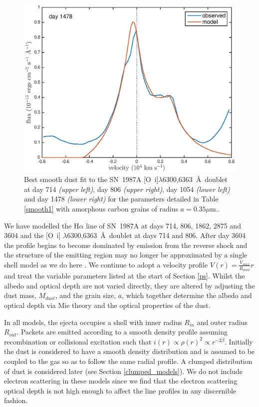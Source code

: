 \documentclass[useAMS,usenatbib,usegraphicx]{mnras}
\begin{document}
\begin{figure}
\begin{center}
\includegraphics[trim =37 10 45 15,clip=true,scale=0.41]{smooth/best_fit/d1478OI}
\caption{Best smooth dust fit to the SN~1987A [O~{\sc i}]$\lambda$6300,6363~\AA\ doublet at day 714 \textit{(upper left)}, day 806 \textit{(upper right)}, day 1054 \textit{(lower left)} and day 1478 \textit{(lower right)} for the parameters detailed in Table \ref{smooth1} with amorphous carbon grains of radius $a=0.35 \mu$m..}
\label{OI_smooth}
\end{center}
\end{figure}


We have  modelled the H$\alpha$ line of SN~1987A at days 714, 806, 1862, 2875 and 3604 and the 
[O~{\sc i}] $\lambda$6300,6363~\AA\ doublet at days 714 and 806. After day 3604 the profile begins to become dominated by emission from the reverse shock 
and the structure of the emitting region may no longer be approximated by 
a single shell model as we do here \citep{Fransson2013}.  We continue to adopt a velocity profile $V(r) = 
\frac{V_{max}}{R_{max}}r$ and treat the variable parameters listed at the start of 
Section \ref{ps}.  Whilst the albedo and optical depth are not varied 
directly, they are altered by adjusting the dust mass, $M_{dust}$, and the 
grain size, $a$, which together determine the albedo and optical 
depth via  Mie theory and the optical properties of the 
dust.

In all models, the ejecta occupies a shell with inner radius $R_{in}$ and 
outer radius $R_{out}$.  Packets are emitted according to a smooth density 
profile assuming recombination or collisional excitation such that $i(r) \propto \rho(r)^2 \propto 
r^{-2\beta}$.  Initially the dust is considered to have a smooth density 
distribution and is assumed to be coupled to the gas so as to follow the same 
radial profile.  A clumped distribution of dust is considered later (see 
Section \ref{clumped_models}).  We do not include electron scattering in 
these models since we find that the electron scattering optical depth is not high enough to affect the line 
profiles in any discernible fashion.
\end{document}
